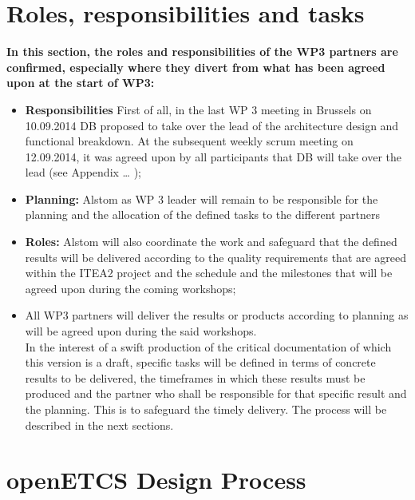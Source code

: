 \section{Roles, responsibilities and tasks}
\textbf{In this section, the roles and responsibilities of the WP3 partners are confirmed, especially where they divert from what has been agreed upon at the start of WP3:}

\begin{itemize}
\item\textbf{Responsibilities} First of all, in the last WP 3 meeting in Brussels on  10.09.2014 DB proposed to take over the lead of the architecture design and functional breakdown. At the subsequent weekly scrum meeting on 12.09.2014,  it was agreed upon by all participants that DB will take over the lead (see Appendix … );\\
\item\textbf{Planning:} Alstom as WP 3 leader will remain to be responsible for the planning and the allocation of the defined tasks to the different partners\\
\item\textbf{Roles:} Alstom will also coordinate the work and safeguard that the defined results will be delivered according to the quality requirements that are agreed within the ITEA2 project and the schedule and the milestones that will be agreed upon during the coming workshops;\\
\item All WP3 partners will deliver the results or products according to planning as will be agreed upon during the said workshops. \\

In the interest of a swift production of the critical documentation of which this version is a draft, specific tasks will be defined in terms of concrete results to be delivered, the timeframes in which these results must be produced and the partner who shall be responsible for that specific result and the planning. This is to safeguard the timely delivery. The process will be described in the next sections.\\
\end{itemize}






\section{openETCS Design Process}


